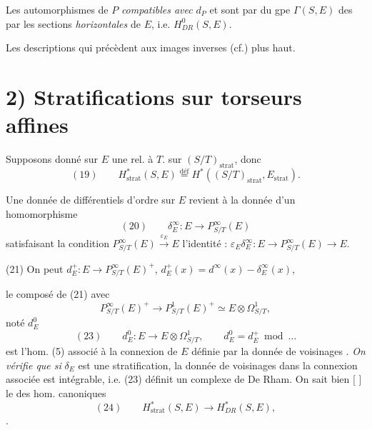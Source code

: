 \documentclass[11pt,a4paper]{article}
\begin{document}
Les  automorphismes de $P$ \emph{compatibles avec} $d_P$
\struck{\ill{}} et \struck{\ill{}} sont  par 
\ill{} du gpe $\Gamma(S,E)$ des   par les sections
\emph{horizontales} de $E$, i.e. $H^0_{DR}(S,E)$.

Les descriptions qui précèdent  
aux images inverses  (cf.) plus haut.

\section{2) Stratifications sur torseurs affines}

Supposons donné sur $E$ une  rel. à $T$.  sur $(S/T)_{\mathrm{strat}}$, donc \ill{}  \ill{}
\[
(19)\qquad H^*_{\mathrm{strat}}(S,E) \overset{\mathrm{déf}}{=} H^*((S/T)_{\mathrm{strat}}, E_{\mathrm{strat}}) .
\]
 

Une donnée de  différentiels d'ordre \uncertain{$\infty$} sur $E$ revient
à la donnée d'un homomorphisme
\[
(20)\qquad \delta^\infty_E : E \longrightarrow P^\infty_{S/T}(E)
\]
satisfaisant la condition  $P^\infty_{S/T}(E) \xrightarrow{\varepsilon_E} E$  l'identité :
$\varepsilon_E \delta^\infty_E : E \to P^\infty_{S/T}(E) \to E$.

(21) On peut \ill{} \struck{\ill{}}
$d^+_E : E \to P^\infty_{S/T}(E)^+$, $d^+_E(x) = d^\infty(x) - \delta^\infty_E(x)$,
\struck{\ill{}}


 le composé de (21) avec
\[
P^\infty_{S/T}(E)^+ \longrightarrow P^1_{S/T}(E)^+ \simeq E \otimes \Omega^1_{S/T} ,
\]
\struck{\ill{}} noté $d^0_E$
\[
(23)\qquad d^0_E : E \longrightarrow E \otimes \Omega^1_{S/T} , \qquad d^0_E = d^+_E \bmod \ldots
\]
est l'hom. (5) associé à la connexion de $E$ définie par la donnée de voisinages
.  \emph{On vérifie que si}  $\delta_E$ est une
stratification,  la donnée de voisinages 
dans la connexion associée est intégrable, i.e. (23)
définit un complexe de De Rham.
On sait bien [ ] le \ill{} \ill{} des hom. canoniques
\[
(24)\qquad H^*_{\mathrm{strat}}(S,E) \longrightarrow H^*_{DR}(S,E) ,
\]
 .
\end{document}
